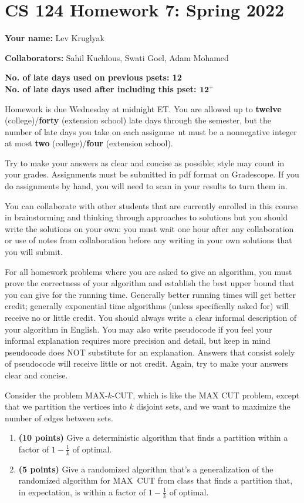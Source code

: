 \documentclass[11pt,letterpaper]{article}
\begin{document}
\section*{CS 124 Homework 7: Spring 2022}

\textbf{Your name:} Lev Kruglyak

\textbf{Collaborators:} Sahil Kuchlous, Swati Goel, Adam Mohamed

\textbf{No. of late days used on previous psets: 12}\\
\textbf{No. of late days used after including this pset: $\textbf{12}^+$}

Homework is due Wednesday at midnight ET. You are allowed up to {\bf twelve} (college)/{\bf forty} (extension school) late days through the semester, but the number of late days you take on each assignme\
nt must be a nonnegative integer at most {\bf two} (college)/{\bf four} (extension school).

Try to make your answers as clear and concise as possible;
style may count in your grades. Assignments must be submitted in pdf format on Gradescope. If you do assignments by hand, you will need to scan in your results to turn them in.

You can collaborate with other students that are currently enrolled in this
course in brainstorming and thinking through approaches to solutions but you should write
the solutions on your own: you must wait one hour after any collaboration or use of notes
from collaboration before any writing in your own solutions that you will submit. 

For all homework problems where you are asked to give an algorithm, you must prove the correctness
of your algorithm and establish the best upper bound that you can give for the running time. Generally
better running times will get better credit; generally exponential time algorithms (unless specifically asked
for) will receive no or little credit. You should always write a clear informal description of your algorithm
in English. You may also write pseudocode if you feel your informal explanation requires more precision
and detail, but keep in mind pseudocode does NOT substitute for an explanation. Answers that consist
solely of pseudocode will receive little or not credit. Again, try to make your answers clear and concise.

\pagebreak
\begin{problem}
    Consider the problem MAX-$k$-CUT, which is like the MAX CUT problem, except that we partition the vertices into $k$ disjoint sets, and we want to maximize the number of edges between sets. 
    \begin{enumerate}
        \item {\bf (10 points)} Give a deterministic algorithm that finds a partition within a factor of $1-\frac1k$ of optimal.
        \item {\bf (5 points)} Give a randomized algorithm that's a generalization of the randomized algorithm for MAX~CUT from class that finds a partition that, in expectation, is within a factor of $1-\frac1k$ of optimal.
    \end{enumerate}
\end{problem}
\end{document}
